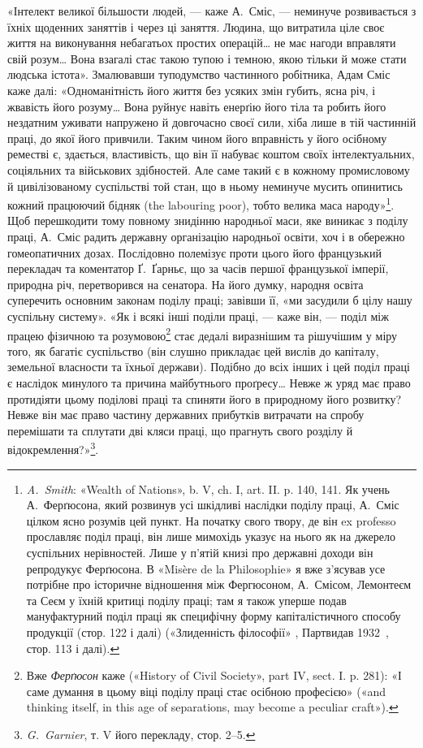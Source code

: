 «Інтелект великої більшости людей, — каже А.~Сміс, — неминуче
розвивається з їхніх щоденних заняттів і через ці заняття.
Людина, що витратила ціле своє життя на виконування небагатьох
простих операцій\dots{} не має нагоди вправляти свій розум\dots{} Вона
взагалі стає такою тупою і темною, якою тільки й може стати
людська істота». Змалювавши туподумство частинного робітника,
Адам Сміс каже далі: «Одноманітність його життя без усяких
змін губить, ясна річ, і жвавість його розуму\dots{} Вона руйнує
навіть енерґію його тіла та робить його нездатним уживати напружено
й довгочасно своєї сили, хіба лише в тій частинній
праці, до якої його привчили. Таким чином його вправність у його
осібному реместві є, здається, властивість, що він її набуває коштом
своїх інтелектуальних, соціяльних та військових здібностей.
Але саме такий є в кожному промисловому й цивілізованому
суспільстві той стан, що в ньому неминуче мусить опинитись
кожний працюючий бідняк (the labouring poor), тобто велика маса
народу»\footnote{
\emph{A.~Smith}: «Wealth of Nations», b. V, ch. I, art. II. p. 140, 141.
Як учень А.~Ферґюсона, який розвинув усі шкідливі наслідки поділу
праці, А.~Сміс цілком ясно розумів цей пункт. На початку свого твору,
де він ex professo прославляє поділ праці, він лише мимохідь указує на
нього як на джерело суспільних нерівностей. Лише у п’ятій книзі про
державні доходи він репродукує Ферґюсона. В «Misère de la Philosophie»
я вже з’ясував усе потрібне про історичне відношення між Фергюсоном,
А.~Смісом, Лемонтеєм та Сеєм у їхній критиці поділу праці; там
я також уперше подав мануфактурний поділ праці як специфічну форму
капіталістичного способу продукції (стор. 122 і далі) («Злиденність філософії»
, Партвидав 1932~, стор. 113 і далі).
}. Щоб перешкодити тому повному знидінню народньої
маси, яке виникає з поділу праці, А.~Сміс радить державну
організацію народньої освіти, хоч і в обережно гомеопатичних
дозах. Послідовно полемізує проти цього його французький
перекладач та коментатор Ґ.~Ґарньє, що за часів першої французької
імперії, природна річ, перетворився на сенатора. На його
думку, народня освіта суперечить основним законам поділу праці;
завівши її, «ми засудили б цілу нашу суспільну систему». «Як
і всякі інші поділи праці, — каже він, — поділ між працею фізичною
та розумовою\footnote{
Вже \emph{Ферґюсон} каже («History of Civil Society», part IV, sect. I.
p. 281): «І саме думання в цьому віці поділу праці стає осібною професією»
(«and thinking itself, in this age of separations, may become a peculiar
craft»).
} стає дедалі виразнішим та рішучішим у
міру того, як багатіє суспільство (він слушно прикладає цей
вислів до капіталу, земельної власности та їхньої держави).
Подібно до всіх інших і цей поділ праці є наслідок минулого та
причина майбутнього проґресу\dots{} Невже ж уряд має право протидіяти
цьому поділові праці та спиняти його в природному його
розвитку? Невже він має право частину державних прибутків
витрачати на спробу перемішати та сплутати дві кляси праці,
що прагнуть свого розділу й відокремлення?»\footnote{
\emph{G.~Garnier}, т. V його перекладу, стор. 2--5.
}.

